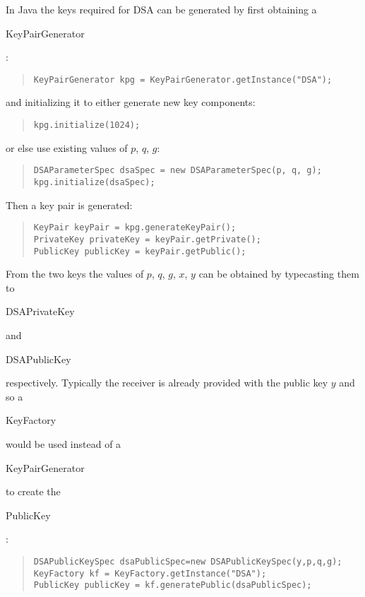 In Java the keys required for DSA can be generated by first obtaining a
\begin{code}KeyPairGenerator\end{code}:
\begin{quote}\begin{code}\begin{verbatim}
KeyPairGenerator kpg = KeyPairGenerator.getInstance("DSA");
\end{verbatim}\end{code}\end{quote}
and initializing it to either generate new key components:
\begin{quote}\begin{code}\begin{verbatim}
kpg.initialize(1024);
\end{verbatim}\end{code}\end{quote}
or else use existing values of $p$, $q$, $g$:
\begin{quote}\begin{code}\begin{verbatim}
DSAParameterSpec dsaSpec = new DSAParameterSpec(p, q, g);
kpg.initialize(dsaSpec);
\end{verbatim}\end{code}\end{quote}
Then a key pair is generated:
\begin{quote}\begin{code}\begin{verbatim}
KeyPair keyPair = kpg.generateKeyPair();
PrivateKey privateKey = keyPair.getPrivate();
PublicKey publicKey = keyPair.getPublic();
\end{verbatim}\end{code}\end{quote}
From the two keys the values of $p$, $q$, $g$, $x$, $y$ can be
obtained by typecasting them to \begin{code}DSAPrivateKey\end{code}
and \begin{code}DSAPublicKey\end{code} respectively.
Typically the receiver is already provided with the public key $y$
and so a \begin{code}KeyFactory\end{code} would be used instead of a
\begin{code}KeyPairGenerator\end{code} to create the \begin{code}PublicKey\end{code}:
\begin{quote}\begin{code}\begin{verbatim}
DSAPublicKeySpec dsaPublicSpec=new DSAPublicKeySpec(y,p,q,g);
KeyFactory kf = KeyFactory.getInstance("DSA");
PublicKey publicKey = kf.generatePublic(dsaPublicSpec);
\end{verbatim}\end{code}\end{quote}

